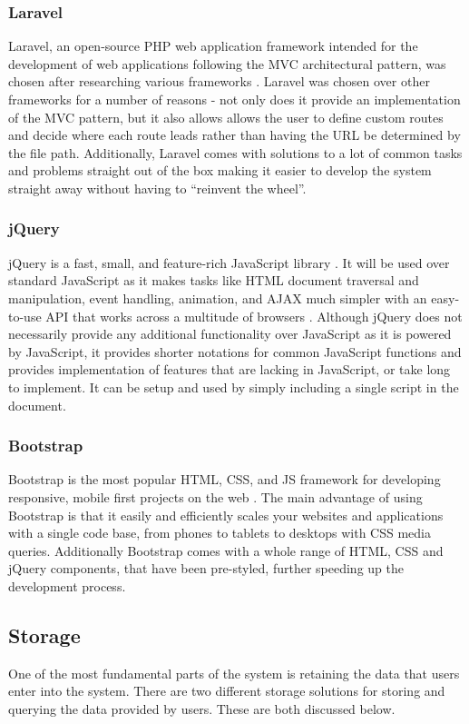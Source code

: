 \subsubsection{Laravel}
Laravel, an open-source PHP web application framework intended for the development of web applications following the MVC architectural pattern, was chosen after researching various frameworks \cite{Laravel:Home}. Laravel was chosen over other frameworks for a number of reasons - not only does it provide an implementation of the MVC pattern, but it also allows allows the user to define custom routes and decide where each route leads rather than having the URL be determined by the file path. Additionally, Laravel comes with solutions to a lot of common tasks and problems straight out of the box making it easier to develop the system straight away without having to ``reinvent the wheel''.

\subsubsection{jQuery} 
jQuery is a fast, small, and feature-rich JavaScript library \cite{jQuery:Home}. It will be used over standard JavaScript as it makes tasks like HTML document traversal and manipulation, event handling, animation, and AJAX much simpler with an easy-to-use API that works across a multitude of browsers \cite{jQuery:Home}. Although jQuery does not necessarily provide any additional functionality over JavaScript as it is powered by JavaScript, it provides shorter notations for common JavaScript functions and provides implementation of features that are lacking in JavaScript, or take long to implement. It can be setup and used by simply including a single script in the document.

\subsubsection{Bootstrap} 
Bootstrap is the most popular HTML, CSS, and JS framework for developing responsive, mobile first projects on the web \cite{Bootstrap:Home}. The main advantage of using Bootstrap is that it easily and efficiently scales your websites and applications with a single code base, from phones to tablets to desktops with CSS media queries. Additionally Bootstrap comes with a whole range of HTML, CSS and jQuery components, that have been pre-styled, further speeding up the development process.

\subsection{Storage}
One of the most fundamental parts of the system is retaining the data that  users enter into the system. There are two different storage solutions for storing and querying the data provided by users. These are both discussed below.

